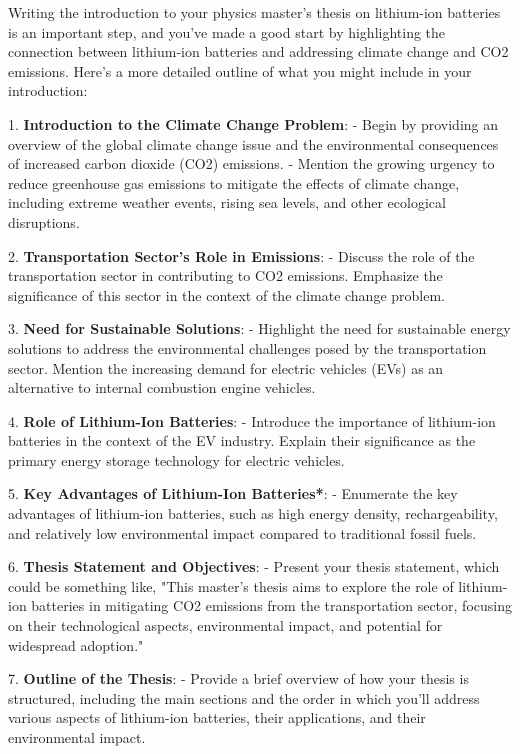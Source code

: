 Writing the introduction to your physics master's thesis on lithium-ion batteries is an important step, and you've made a good start by highlighting the connection between lithium-ion batteries and addressing climate change and CO2 emissions. Here's a more detailed outline of what you might include in your introduction:

1. \textbf{Introduction to the Climate Change Problem}:
   - Begin by providing an overview of the global climate change issue and the environmental consequences of increased carbon dioxide (CO2) emissions.
   - Mention the growing urgency to reduce greenhouse gas emissions to mitigate the effects of climate change, including extreme weather events, rising sea levels, and other ecological disruptions.

2. \textbf{Transportation Sector's Role in Emissions}:
   - Discuss the role of the transportation sector in contributing to CO2 emissions. Emphasize the significance of this sector in the context of the climate change problem.

3. \textbf{Need for Sustainable Solutions}:
   - Highlight the need for sustainable energy solutions to address the environmental challenges posed by the transportation sector. Mention the increasing demand for electric vehicles (EVs) as an alternative to internal combustion engine vehicles.

4. \textbf{Role of Lithium-Ion Batteries}:
   - Introduce the importance of lithium-ion batteries in the context of the EV industry. Explain their significance as the primary energy storage technology for electric vehicles.

5. \textbf{Key Advantages of Lithium-Ion Batteries*}:
   - Enumerate the key advantages of lithium-ion batteries, such as high energy density, rechargeability, and relatively low environmental impact compared to traditional fossil fuels.

6. \textbf{Thesis Statement and Objectives}:
   - Present your thesis statement, which could be something like, "This master's thesis aims to explore the role of lithium-ion batteries in mitigating CO2 emissions from the transportation sector, focusing on their technological aspects, environmental impact, and potential for widespread adoption."

7. \textbf{Outline of the Thesis}:
   - Provide a brief overview of how your thesis is structured, including the main sections and the order in which you'll address various aspects of lithium-ion batteries, their applications, and their environmental impact.

